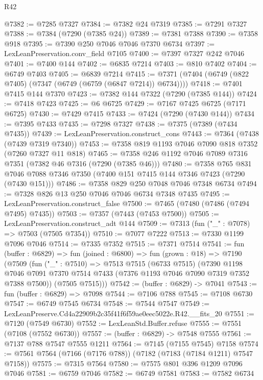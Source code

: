 \begin{lexlean}{R42}
\begin{coremodule}
{@7382 := @7285 @7327
@7384 := @7382 @24 @7319
@7385 := @7291 @7327
@7388 := @7384 (@7290 (@7385 @24))
@7389 := @7381 @7388
@7390 := @7358 @918
@7395 := @7390 @250 @7046 @7046 @7370 @6734
@7397 := LexLeanPreservation.conv_field @7105
@7400 := @7397 @7327 @242 @7046
@7401 := @7400 @144
@7402 := @6835 @7214
@7403 := @810 @7402
@7404 := @6749 @7403
@7405 := @6839 @7214
@7415 := @7371 (@7404 (@6749 (@822 @7405) (@7347 (@6749 (@6759 (@6847 @7214)) @6734))))
@7418 := @7401 @7415 @144 @7370
@7423 := @7382 @144 @7322 (@7290 (@7385 @144))
@7424 := @7418 @7423
@7425 := @6 @6725
@7429 := @7167 @7425 @6725 (@7171 @6725)
@7430 := @7429 @7415
@7433 := @7424 (@7290 (@7430 @144))
@7434 := @7395 @7433
@7435 := @7298 @7327
@7438 := @7375 (@7389 (@7434 @7435))
@7439 := LexLeanPreservation.construct_cons
@7443 := @7364 (@7438 (@7439 @7319 @7340))
@7453 := @7358 @819 @1193 @7046 @7090 @818 @7352 (@7260 @7327 @11 @818)
@7465 := @7358 @246 @1192 @7046 @7089 @7316 @7351 (@7382 @46 @7316 (@7290 (@7385 @46)))
@7480 := @7358
    @765
    @831
    @7046
    @7088
    @7346
    @7350
    (@7400 @151 @7415 @144 @7346 @7423 (@7290 (@7430 @151)))
@7486 := @7358 @829 @250 @7048 @7046 @7348 @6734
@7494 := @7328 @826 @13 @250 @7046 @7046 @6734 @7348 @7435
@7495 := LexLeanPreservation.construct_false
@7500 := @7465 (@7480 (@7486 (@7494 @7495) @7435))
@7503 := @7357 (@7443 (@7453 @7500))
@7505 := LexLeanPreservation.construct_adt @144
@7509 := @7313 (fun ("_" : @7078) => @7503 (@7505 @7354))
@7510 := @7077 @7222
@7513 := @7330 @1199 @7096 @7046
@7514 := @7335 @7352
@7515 := @7371 @7514
@7541 := fun (buffer : @6829) =>
  fun (joined : @6800) =>
  fun (grown : @18) =>
  @7190
    (@7509
      (fun ("_" : @7510) =>
      @7513
        @7515
        (@6733 @7515)
        (@7390
          @1198
          @7046
          @7091
          @7370
          @7514
          @7433
          (@7376 @1193 @7046 @7090 @7319 @7352 @7388 @7500))
        (@7505 @7515)))
@7542 := (buffer : @6829) -> @7041
@7543 := fun (buffer : @6829) => @7098
@7544 := @7106 @788
@7545 := @7108 @6730
@7547 := @6749 @7545 @6734
@7548 := @7544 @7547
@7549 := LexLeanPreserve.Cd4a22909b2c35f41f6f59ae0eec5022e.R42.__fits_20
@7551 := @7120 (@7549 @6730)
@7552 := LexLeanStd.Buffer.refuse
@7555 := @7551 (@7108 (@7552 @6730))
@7557 := (buffer : @6829) -> @7548 @7555
@7561 := @7137 @788 @7547 @7555 @1211
@7564 := @7145 (@7155 @7545) @7158
@7574 := @7561 @7564 (@7166 (@7176 @788)) (@7182 (@7183 (@7184 @1211) @7547 @7158))
@7575 := @7315 @7564
@7580 := @7575 @801 @396 @1209 @7096 @7046
@7581 := @6759 @7046
@7582 := @6749 @7581
@7583 := @7582 @6734
}
\end{coremodule}
\end{lexlean}
